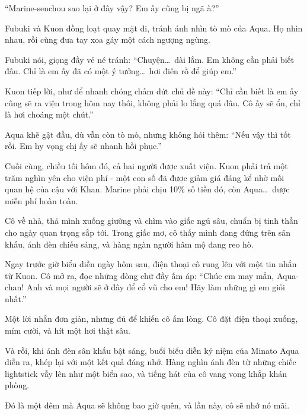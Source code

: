 \documentclass[../main.tex]{subfiles}
\begin{document}
``Marine-senchou sao lại ở đây vậy? Em ấy cũng bị ngã à?''

Fubuki và Kuon đồng loạt quay mặt đi, tránh ánh nhìn tò mò của Aqua. Họ nhìn nhau, rồi cùng đưa tay xoa gáy một cách ngượng ngùng.

Fubuki nói, giọng đầy vẻ né tránh: ``Chuyện\dots\ dài lắm. Em không cần phải biết đâu. Chỉ là em ấy đã có một ý tưởng\dots\ hơi điên rồ để giúp em.''

Kuon tiếp lời, như để nhanh chóng chấm dứt chủ đề này: ``Chỉ cần biết là em ấy cũng sẽ ra viện trong hôm nay thôi, không phải lo lắng quá đâu. Cô ấy sẽ ổn, chỉ là hơi choáng một chút.''

Aqua khẽ gật đầu, dù vẫn còn tò mò, nhưng không hỏi thêm: ``Nếu vậy thì tốt rồi. Em hy vọng chị ấy sẽ nhanh hồi phục.''

Cuối cùng, chiều tối hôm đó, cả hai người được xuất viện. Kuon phải trả một trăm nghìn yên cho viện phí - một con số đã được giảm giá đáng kể nhờ mối quan hệ của cậu với Khan. Marine phải chịu 10\% số tiền đó, còn Aqua\dots\ được miễn phí hoàn toàn.

Cô về nhà, thả mình xuống giường và chìm vào giấc ngủ sâu, chuẩn bị tinh thần cho ngày quan trọng sắp tới. Trong giấc mơ, cô thấy mình đang đứng trên sân khấu, ánh đèn chiếu sáng, và hàng ngàn người hâm mộ đang reo hò.

\il

Ngay trước giờ biểu diễn ngày hôm sau, điện thoại cô rung lên với một tin nhắn từ Kuon. Cô mở ra, đọc những dòng chữ đầy ấm áp: ``Chúc em may mắn, Aqua-chan! Anh và mọi người sẽ ở đây để cổ vũ cho em! Hãy làm những gì em giỏi nhất.''

Một lời nhắn đơn giản, nhưng đủ để khiến cô ấm lòng. Cô đặt điện thoại xuống, mỉm cười, và hít một hơi thật sâu.

Và rồi, khi ánh đèn sân khấu bật sáng, buổi biểu diễn kỷ niệm của Minato Aqua diễn ra, khép lại với một kết quả đáng nhớ. Hàng nghìn ánh đèn từ những chiếc lightstick vẫy lên như một biển sao, và tiếng hát của cô vang vọng khắp khán phòng.

Đó là một đêm mà Aqua sẽ không bao giờ quên, và lần này, cô sẽ nhớ nó mãi.
\end{document}

